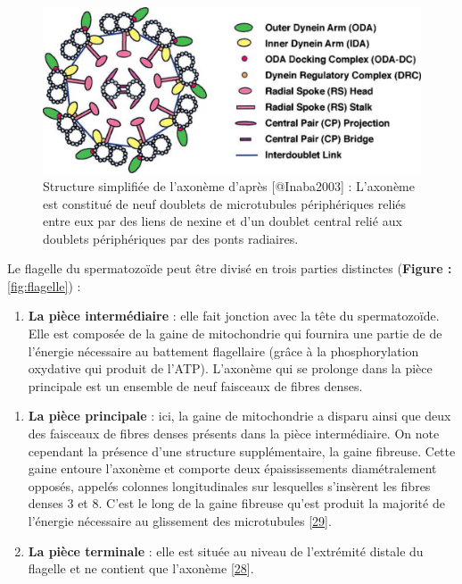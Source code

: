 \documentclass[12pt,twoside]{ugathesis}
\providecommand{\tightlist}{%
  \setlength{\itemsep}{0pt}\setlength{\parskip}{0pt}}
\theoremstyle{definition}
\theoremstyle{definition}
\theoremstyle{remark}
\begin{document}
\begin{figure}

{\centering \includegraphics[scale=.3]{figure/axoneme} 

}

\caption[Structure simplifiée de l'axonème]{Structure simplifiée de l'axonème d'après [@Inaba2003] : L'axonème est constitué de neuf doublets de microtubules périphériques reliés entre eux par des liens de nexine et d'un doublet central relié aux doublets périphériques par des ponts radiaires.}\label{fig:axoneme}
\end{figure}

Le flagelle du spermatozoïde peut être divisé en trois parties
distinctes (\textbf{Figure : }\ref{fig:flagelle}) :

\begin{enumerate}
\def\labelenumi{\arabic{enumi}.}
\tightlist
\item
  \textbf{La pièce intermédiaire} : elle fait jonction avec la tête du
  spermatozoïde. Elle est composée de la gaine de mitochondrie qui
  fournira une partie de de l'énergie nécessaire au battement
  flagellaire (grâce à la phosphorylation oxydative qui produit de
  l'ATP). L'axonème qui se prolonge dans la pièce principale est un
  ensemble de neuf faisceaux de fibres denses.
\end{enumerate}

\newpage

\begin{enumerate}
\def\labelenumi{\arabic{enumi}.}
\setcounter{enumi}{1}
\tightlist
\item
  \textbf{La pièce principale} : ici, la gaine de mitochondrie a disparu
  ainsi que deux des faisceaux de fibres denses présents dans la pièce
  intermédiaire. On note cependant la présence d'une structure
  supplémentaire, la gaine fibreuse. Cette gaine entoure l'axonème et
  comporte deux épaississements diamétralement opposés, appelés colonnes
  longitudinales sur lesquelles s'insèrent les fibres denses 3 et 8.
  C'est le long de la gaine fibreuse qu'est produit la majorité de
  l'énergie nécessaire au glissement des microtubules
  {[}\protect\hyperlink{ref-Eddy2007}{29}{]}.\\
\item
  \textbf{La pièce terminale} : elle est située au niveau de l'extrémité
  distale du flagelle et ne contient que l'axonème
  {[}\protect\hyperlink{ref-Inaba2003}{28}{]}.
\end{enumerate}
\end{document}
